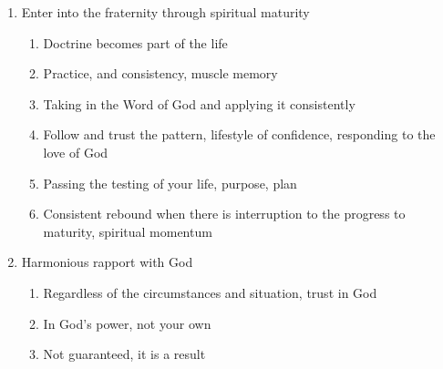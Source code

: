 \documentclass[11pt]{article}
\begin{document}
\begin{enumerate}
\begin{enumerate}
		\item Enter into the fraternity through spiritual maturity
		\begin{enumerate}
			\item Doctrine becomes part of the life
			\item Practice, and consistency, muscle memory
			\item Taking in the Word of God and applying it consistently
			\item Follow and trust the pattern, lifestyle of confidence, responding to the love of God
			\item Passing the testing of your life, purpose, plan
			\item Consistent rebound when there is interruption to the progress to maturity, spiritual momentum 
		\end{enumerate}
	
		\item Harmonious rapport with God
		\begin{enumerate}
			\item Regardless of the circumstances and situation, trust in God
			\item In God's power, not your own
			\item Not guaranteed, it is a result
		\end{enumerate}
		
	\end{enumerate}
\end{enumerate}
\end{document}
